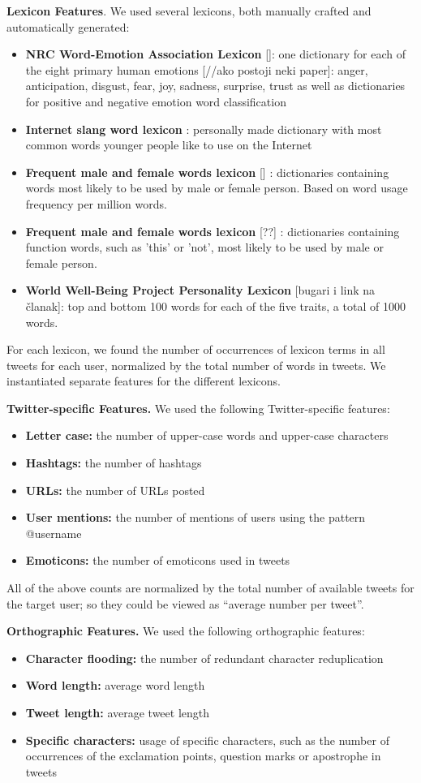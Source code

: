 \documentclass[10pt, a4paper]{article}
\begin{document}
\textbf{Lexicon Features}. We used several lexicons, both manually crafted and automatically generated:
\begin{itemize}[noitemsep,nolistsep]
\item \textbf{NRC Word-Emotion Association Lexicon} []: one dictionary for each of the eight primary human emotions [//ako postoji neki paper]: anger, anticipation, disgust, fear, joy, sadness, surprise, trust as well as dictionaries for positive and negative emotion word classification
\item \textbf{Internet slang word lexicon} : personally made dictionary with most common words younger people like to use on the Internet
\item \textbf{Frequent male and female words lexicon} [] : dictionaries containing words most likely to be used by male or female person. Based on word usage frequency per million words.
\item \textbf{Frequent male and female words lexicon} [??] : dictionaries containing function words, such as 'this' or 'not', most likely to be used by male or female person.
\item \textbf{World Well-Being Project Personality Lexicon } [bugari i link na članak]:  top and bottom 100 words for each of the five traits, a total of 1000 words.
\end{itemize}
For each lexicon, we found the number of occurrences of lexicon terms in all tweets for each user, normalized by the total number of words in tweets. We instantiated separate features for the different lexicons.

\textbf{Twitter-specific Features.} We used the following Twitter-specific features:
\begin{itemize}[noitemsep,nolistsep]
\item \textbf{Letter case:} the number of upper-case words and upper-case characters
\item \textbf{Hashtags:} the number of hashtags
\item \textbf{URLs:} the number of URLs posted
\item \textbf{User mentions:} the number of mentions of users using the pattern @username
\item \textbf{Emoticons:} the number of emoticons used in tweets
\end{itemize}
All of the above counts are normalized by the total number of available tweets
for the target user; so they could be viewed as “average number per tweet”.

\textbf{Orthographic Features.} We used the following orthographic features:
\begin{itemize}[noitemsep,nolistsep] 
\item \textbf{Character flooding:} the number of redundant character reduplication 
\item \textbf{Word length:} average word length
\item \textbf{Tweet length:} average tweet length
\item \textbf{Specific characters:} usage of specific characters, such as the number of occurrences of the exclamation points, question marks or apostrophe in tweets
\end{itemize}
\end{document}
